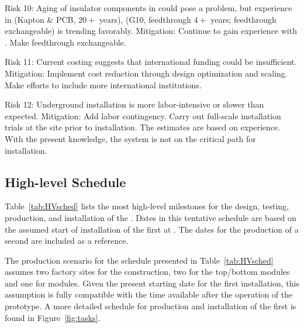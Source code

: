 Risk 10: Aging of insulator components in  could %
pose a problem,  but  experience in  (Kapton \& PCB, $20+$ years),  (G10, feedthrough $4+$ years; feedthrough exchangeable) is trending favorably. Mitigation: %
Continue to gain experience with . Make feedthrough exchangeable.

Risk 11: Current costing suggests that international funding could be %
insufficient. Mitigation: Implement cost reduction through design optimization and scaling. Make efforts to include more international %
institutions. 

Risk 12: Underground installation is more labor-intensive or slower than expected. Mitigation: Add labor contingency. Carry out full-scale installation trials at the   site prior to installation. The estimates are based on  experience. With the present knowledge, the  system is not on the critical path for installation.

\subsection{High-level Schedule}
\label{sec:fdsp-hv-org-cs}

Table~\ref{tab:HVsched} lists the most high-level milestones for the design, testing, production, and installation of the  . Dates in this tentative schedule are based on the assumed start of installation of the first  at . The dates for the  production of a second  are %
included as a reference.

 The production scenario %
 for the schedule presented in Table~\ref{tab:HVsched} assumes %
 two factory sites for the  construction, two for the top/bottom  modules and one for  modules. Given the present starting date %
 for  the first  installation, this assumption is fully compatible with the time available after the operation of the  prototype.
 A more detailed schedule for production and installation of the first  is found in %
 Figure~\ref{fig:tasks}.

